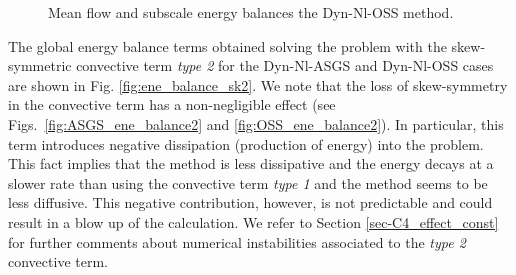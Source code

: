 \begin{figure}[h!]
  \centering
  \caption{Mean flow and subscale energy balances the Dyn-Nl-OSS method.}
  \label{fig:OSS_ene_balance_split}
\end{figure}

The global energy balance terms obtained solving the problem with the skew-symmetric convective term \textit{type 2} for the Dyn-Nl-ASGS and Dyn-Nl-OSS cases are shown in Fig. \ref{fig:ene_balance_sk2}. We note that the loss of skew-symmetry in the convective term has a non-negligible effect (see Figs.~\ref{fig:ASGS_ene_balance2} and \ref{fig:OSS_ene_balance2}). In particular, this term introduces negative dissipation (production of energy) into the problem. %
This fact implies that the method is less dissipative and the energy decays at a slower rate than using the convective term \textit{type 1} and the method seems to be less diffusive. This negative contribution, however, is not predictable and could result in a blow up of the calculation. We refer to Section \ref{sec-C4_effect_const} for further comments about numerical instabilities associated to the \textit{type 2} convective term.%

